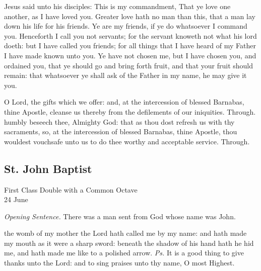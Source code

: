  Jesus said unto his disciples: This is my commandment, That ye love one another, as I have loved you. Greater love hath no man than this, that a man lay down his life for his friends. Ye are my friends, if ye do whatsoever I command you. Henceforth I call you not servants; for the servant knoweth not what his lord doeth: but I have called you friends; for all things that I have heard of my Father I have made known unto you. Ye have not chosen me, but I have chosen you, and ordained you, that ye should go and bring forth fruit, and that your fruit should remain: that whatsoever ye shall ask of the Father in my name, he may give it you.

\secret
{} O Lord, the gifts which we offer: and, at the intercession of blessed Barnabas, thine Apostle, cleanse us thereby from the defilements of our iniquities. Through.
\postcommunion
{} humbly beseech thee, Almighty God: that as thou dost refresh us with thy sacraments, so, at the intercession of blessed Barnabas, thine Apostle, thou wouldest vouchsafe unto us to do thee worthy and acceptable service. Through.


\subsection{St. John Baptist}\label{StJohnBaptist}
\begin{inhead}
    {First Class Double with a Common Octave\\
24 June}
\end{inhead}
\par\noindent
\textit{Opening Sentence.} There was a man sent from God whose name was John.

\introit
{} the womb of my mother the Lord hath called me by my name: and hath made my mouth as it were a sharp sword: beneath the shadow of his hand hath he hid me, and hath made me like to a polished arrow. \textit{Ps.} It is a good thing to give thanks unto the Lord: and to sing praises unto thy name, O most Highest.

